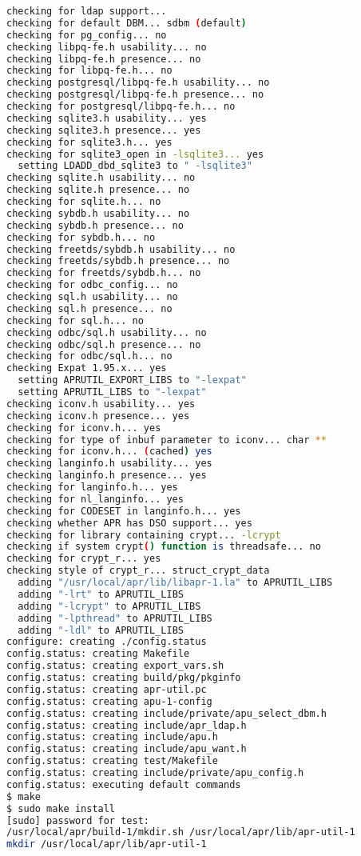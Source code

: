 \begin{lstlisting}[language=bash]
checking for ldap support...
checking for default DBM... sdbm (default)
checking for pg_config... no
checking libpq-fe.h usability... no
checking libpq-fe.h presence... no
checking for libpq-fe.h... no
checking postgresql/libpq-fe.h usability... no
checking postgresql/libpq-fe.h presence... no
checking for postgresql/libpq-fe.h... no
checking sqlite3.h usability... yes
checking sqlite3.h presence... yes
checking for sqlite3.h... yes
checking for sqlite3_open in -lsqlite3... yes
  setting LDADD_dbd_sqlite3 to " -lsqlite3"
checking sqlite.h usability... no
checking sqlite.h presence... no
checking for sqlite.h... no
checking sybdb.h usability... no
checking sybdb.h presence... no
checking for sybdb.h... no
checking freetds/sybdb.h usability... no
checking freetds/sybdb.h presence... no
checking for freetds/sybdb.h... no
checking for odbc_config... no
checking sql.h usability... no
checking sql.h presence... no
checking for sql.h... no
checking odbc/sql.h usability... no
checking odbc/sql.h presence... no
checking for odbc/sql.h... no
checking Expat 1.95.x... yes
  setting APRUTIL_EXPORT_LIBS to "-lexpat"
  setting APRUTIL_LIBS to "-lexpat"
checking iconv.h usability... yes
checking iconv.h presence... yes
checking for iconv.h... yes
checking for type of inbuf parameter to iconv... char **
checking for iconv.h... (cached) yes
checking langinfo.h usability... yes
checking langinfo.h presence... yes
checking for langinfo.h... yes
checking for nl_langinfo... yes
checking for CODESET in langinfo.h... yes
checking whether APR has DSO support... yes
checking for library containing crypt... -lcrypt
checking if system crypt() function is threadsafe... no
checking for crypt_r... yes
checking style of crypt_r... struct_crypt_data
  adding "/usr/local/apr/lib/libapr-1.la" to APRUTIL_LIBS
  adding "-lrt" to APRUTIL_LIBS
  adding "-lcrypt" to APRUTIL_LIBS
  adding "-lpthread" to APRUTIL_LIBS
  adding "-ldl" to APRUTIL_LIBS
configure: creating ./config.status
config.status: creating Makefile
config.status: creating export_vars.sh
config.status: creating build/pkg/pkginfo
config.status: creating apr-util.pc
config.status: creating apu-1-config
config.status: creating include/private/apu_select_dbm.h
config.status: creating include/apr_ldap.h
config.status: creating include/apu.h
config.status: creating include/apu_want.h
config.status: creating test/Makefile
config.status: creating include/private/apu_config.h
config.status: executing default commands
$ make
$ sudo make install
[sudo] password for test: 
/usr/local/apr/build-1/mkdir.sh /usr/local/apr/lib/apr-util-1
mkdir /usr/local/apr/lib/apr-util-1

\end{lstlisting}
